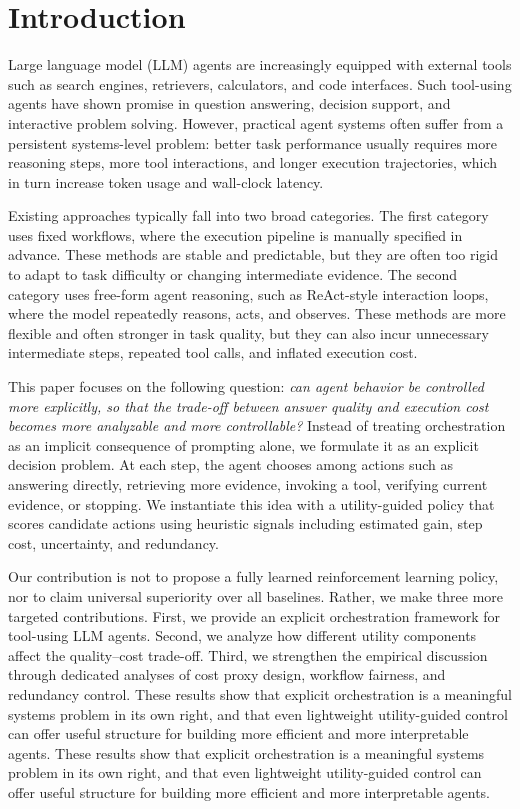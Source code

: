 \section{Introduction}

Large language model (LLM) agents are increasingly equipped with external tools such as search engines, retrievers, calculators, and code interfaces. Such tool-using agents have shown promise in question answering, decision support, and interactive problem solving. However, practical agent systems often suffer from a persistent systems-level problem: better task performance usually requires more reasoning steps, more tool interactions, and longer execution trajectories, which in turn increase token usage and wall-clock latency.

Existing approaches typically fall into two broad categories. The first category uses fixed workflows, where the execution pipeline is manually specified in advance. These methods are stable and predictable, but they are often too rigid to adapt to task difficulty or changing intermediate evidence. The second category uses free-form agent reasoning, such as ReAct-style interaction loops, where the model repeatedly reasons, acts, and observes. These methods are more flexible and often stronger in task quality, but they can also incur unnecessary intermediate steps, repeated tool calls, and inflated execution cost.

This paper focuses on the following question: \emph{can agent behavior be controlled more explicitly, so that the trade-off between answer quality and execution cost becomes more analyzable and more controllable?} Instead of treating orchestration as an implicit consequence of prompting alone, we formulate it as an explicit decision problem. At each step, the agent chooses among actions such as answering directly, retrieving more evidence, invoking a tool, verifying current evidence, or stopping. We instantiate this idea with a utility-guided policy that scores candidate actions using heuristic signals including estimated gain, step cost, uncertainty, and redundancy.

Our contribution is not to propose a fully learned reinforcement learning policy, nor to claim universal superiority over all baselines. Rather, we make three more targeted contributions. First, we provide an explicit orchestration framework for tool-using LLM agents. Second, we analyze how different utility components affect the quality--cost trade-off. Third, we strengthen the empirical discussion through dedicated analyses of cost proxy design, workflow fairness, and redundancy control. These results show that explicit orchestration is a meaningful systems problem in its own right, and that even lightweight utility-guided control can offer useful structure for building more efficient and more interpretable agents.
These results show that explicit orchestration is a meaningful systems problem in its own right, and that even lightweight utility-guided control can offer useful structure for building more efficient and more interpretable agents.


